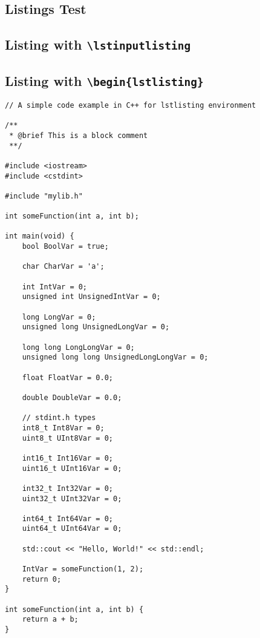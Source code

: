 \documentclass[8pt, a4paper, twoside]{extarticle}
\begin{document}
    \begin{layout}
        \section{Listings Test}
        \subsection{Listing with \texttt{\textbackslash lstinputlisting}}
        
        \subsection{Listing with \texttt{\textbackslash begin\{lstlisting\}}}
\begin{lstlisting}
// A simple code example in C++ for lstlisting environment

/**
 * @brief This is a block comment
 **/

#include <iostream>
#include <cstdint>

#include "mylib.h"

int someFunction(int a, int b);

int main(void) {
    bool BoolVar = true;
    
    char CharVar = 'a';
    
    int IntVar = 0;
    unsigned int UnsignedIntVar = 0;
    
    long LongVar = 0; 
    unsigned long UnsignedLongVar = 0;

    long long LongLongVar = 0;
    unsigned long long UnsignedLongLongVar = 0;
    
    float FloatVar = 0.0;
    
    double DoubleVar = 0.0;
    
    // stdint.h types
    int8_t Int8Var = 0;
    uint8_t UInt8Var = 0;

    int16_t Int16Var = 0;
    uint16_t UInt16Var = 0;

    int32_t Int32Var = 0;
    uint32_t UInt32Var = 0;

    int64_t Int64Var = 0;
    uint64_t UInt64Var = 0;

    std::cout << "Hello, World!" << std::endl;

    IntVar = someFunction(1, 2);
    return 0;
}

int someFunction(int a, int b) {
    return a + b;
}
\end{lstlisting}
    \end{layout}
\end{document}
